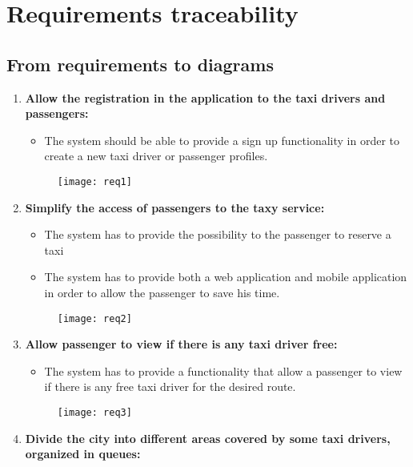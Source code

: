 \documentclass[12pt, oneside]{book}   	%
\begin{document}
\chapter{Requirements traceability}
\section{From requirements to diagrams}
\begin{enumerate}
\item \textbf{Allow the registration in the application to the taxi drivers and passengers:}
\begin{itemize}
\item The system should be able to provide a sign up functionality in order to create a new  taxi driver or passenger profiles.
\end{itemize}
\vspace{2cm}
\begin{figure}[h]
\center \texttt{[image: req1]}
\end{figure}
\clearpage
\item \textbf{Simplify the access of passengers to the taxy service:}
\begin{itemize}
\item The system has to provide the possibility to the passenger to reserve a taxi
\item The system has to provide both a web application and mobile application in order to allow the passenger to save his time.
\end{itemize}
\vspace{2cm}
\begin{figure}[h]
\center \texttt{[image: req2]}
\end{figure}
\clearpage
\item \textbf{Allow passenger to view if there is any taxi driver free:}
\begin{itemize}
\item The system has to provide a functionality that allow a passenger to view if there is any free taxi driver for the desired route.
\end{itemize}
\vspace{2cm}
\begin{figure}[h]
\center \texttt{[image: req3]}
\end{figure}
\clearpage
\item \textbf{Divide the city into different areas covered by some taxi drivers, organized in queues:}
\begin{itemize}

\end{itemize}
\end{enumerate}
\end{document}
